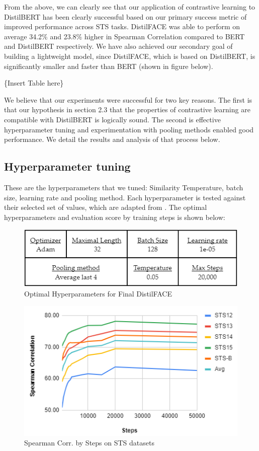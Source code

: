 \documentclass[10pt,twocolumn,letterpaper]{article}
\begin{document}
From the above, we can clearly see that our application of contrastive learning to DistilBERT has been clearly successful based on our primary success metric of improved performance across STS tasks. DistilFACE was able to perform on average 34.2\% and 23.8\% higher in Spearman Correlation compared to BERT and DistilBERT respectively. We have also achieved our secondary goal of building a lightweight model, since DistilFACE, which is based on DistilBERT, is significantly smaller and faster than BERT (shown in figure below).

\{Insert Table here\}

We believe that our experiments were successful for two key reasons. The first is that our hypothesis in section 2.3 that the properties of contrastive learning are compatible with DistilBERT is logically sound. The second is effective hyperparameter tuning and experimentation with pooling methods enabled good performance. We detail the results and analysis of that process below.

\subsection{Hyperparameter tuning}

These are the hyperparameters that we tuned: Similarity Temperature, batch size, learning rate and pooling method. Each hyperparameter is tested against their selected set of values, which are adapted from \cite{2104.08821}. The optimal hyperparameters and evaluation score by training steps is shown below:

\begin{figure}[hbt!]
\centering
\includegraphics[scale=0.60]{images/Optimal-Hyperparameters.png}
\caption{Optimal Hyperparameters for Final DistilFACE}
\label{fig:short}
\end{figure}

\begin{figure}[hbt!]
\centering
\includegraphics[scale=0.70]{images/Results-Evaluation-Score-by-Steps.png}
\caption{Spearman Corr. by Steps on STS datasets}
\label{fig:short}
\end{figure}
\end{document}
